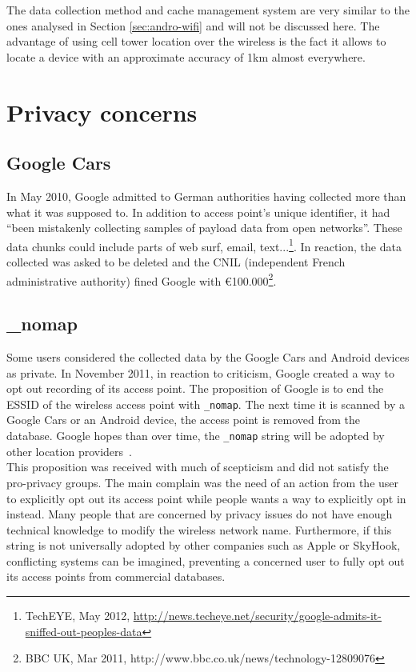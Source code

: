 The data collection method and cache management system are very similar to the ones analysed in Section \ref{sec:andro-wifi} and will not be discussed here.
The advantage of using cell tower location over the wireless is the fact it allows to locate a device with an approximate accuracy of 1km almost everywhere.


\section{Privacy concerns}
\label{sec:andro-priv}

\subsection{Google Cars}
In May 2010, Google admitted to German authorities having collected more than what it was supposed to.
In addition to access point's unique identifier, it had ``been mistakenly collecting samples of payload data from open networks''.
These data chunks could include parts of web surf, email, text...\footnote{TechEYE, May 2012, \url{http://news.techeye.net/security/google-admits-it-sniffed-out-peoples-data}}.
In reaction, the data collected was asked to be deleted and the CNIL (independent French administrative authority) fined Google with €100.000\footnote{BBC UK, Mar 2011, http://www.bbc.co.uk/news/technology-12809076}.\\

\subsection{\_nomap}

Some users considered the collected data by the Google Cars and Android devices as private.
In November 2011, in reaction to criticism, Google created a way to opt out recording of its access point.
The proposition of Google is to end the ESSID of the wireless access point with \texttt{\_nomap}.
The next time it is scanned by a Google Cars or an Android device, the access point is removed from the database.
Google hopes than over time, the \texttt{\_nomap} string will be adopted by other location providers~\cite{nomap}.\\

This proposition was received with much of scepticism and did not satisfy the pro-privacy groups.
The main complain was the need of an action from the user to explicitly opt out its access point while people wants a way to explicitly opt in instead.
Many people that are concerned by privacy issues do not have enough technical knowledge to modify the wireless network name.
Furthermore, if this string is not universally adopted by other companies such as Apple or SkyHook, conflicting systems can be imagined, preventing a concerned user to fully opt out its access points from commercial databases.

